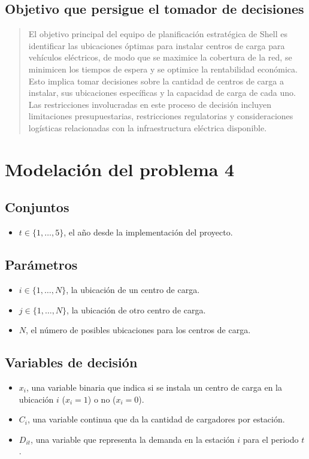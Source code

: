 \documentclass[letterpaper]{article}
\begin{document}
\begin{flushleft}
\subsection{Objetivo que persigue el tomador de decisiones}
\begin{quote}
    El objetivo principal del equipo de planificación estratégica de Shell es identificar las ubicaciones óptimas para instalar centros de carga para vehículos eléctricos, de modo que se maximice la cobertura de la red, se minimicen los tiempos de espera y se optimice la rentabilidad económica. Esto implica tomar decisiones sobre la cantidad de centros de carga a instalar, sus ubicaciones específicas y la capacidad de carga de cada uno. Las restricciones involucradas en este proceso de decisión incluyen limitaciones presupuestarias, restricciones regulatorias y consideraciones logísticas relacionadas con la infraestructura eléctrica disponible. 
\end{quote}

\section{Modelación del problema 4}
\subsection{Conjuntos}
\begin{itemize}
    \item $t \in \{1, \ldots, 5\}$, el año desde la implementación del proyecto.
\end{itemize}
\subsection{Parámetros}
\begin{itemize}
    \item $i \in \{1, \ldots, N\}$, la ubicación de un centro de carga.
    \item $j \in \{1, \ldots, N\}$, la ubicación de otro centro de carga.
    \item $N$, el número de posibles ubicaciones para los centros de carga.
\end{itemize}
\subsection{Variables de decisión} 
\begin{itemize}
    \item $x_i$, una variable binaria que indica si se instala un centro de carga en la ubicación $i$ ($x_i = 1$) o no ($x_i = 0$).
    \item $C_i$, una variable continua que da la cantidad de cargadores por estación.
    \item $D_{it}$, una variable que representa la demanda en la estación $i$ para el periodo $t$.
\end{itemize}

\end{flushleft}
\end{document}
